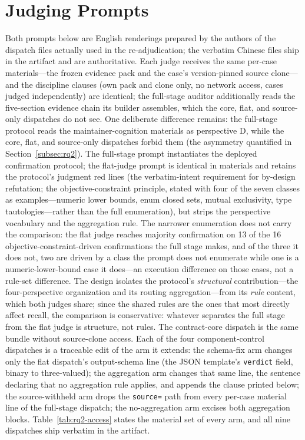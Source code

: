 \documentclass[acmsmall,screen,review,anonymous]{acmart}
\begin{document}



\appendix
\section{Judging Prompts}
\label{app:prompts}

Both prompts below are English renderings prepared by the authors of the dispatch files actually used in the re-adjudication; the verbatim Chinese files ship in the artifact and are authoritative. Each judge receives the same per-case materials---the frozen evidence pack and the case's version-pinned source clone---and the discipline clauses (own pack and clone only, no network access, cases judged independently) are identical; the full-stage auditor additionally reads the five-section evidence chain its builder assembles, which the core, flat, and source-only dispatches do not see. One deliberate difference remains: the full-stage protocol reads the maintainer-cognition materials as perspective D, while the core, flat, and source-only dispatches forbid them (the asymmetry quantified in Section~\ref{subsec:rq2}). The full-stage prompt instantiates the deployed confirmation protocol; the flat-judge prompt is identical in materials and retains the protocol's judgment red lines (the verbatim-intent requirement for by-design refutation; the objective-constraint principle, stated with four of the seven classes as examples---numeric lower bounds, enum closed sets, mutual exclusivity, type tautologies---rather than the full enumeration), but strips the perspective vocabulary and the aggregation rule. The narrower enumeration does not carry the comparison: the flat judge reaches majority confirmation on 13 of the 16 objective-constraint-driven confirmations the full stage makes, and of the three it does not, two are driven by a class the prompt does not enumerate while one is a numeric-lower-bound case it does---an execution difference on those cases, not a rule-set difference. The design isolates the protocol's \emph{structural} contribution---the four-perspective organization and its routing aggregation---from its \emph{rule} content, which both judges share; since the shared rules are the ones that most directly affect recall, the comparison is conservative: whatever separates the full stage from the flat judge is structure, not rules. The contract-core dispatch is the same bundle without source-clone access. Each of the four component-control dispatches is a traceable edit of the arm it extends: the schema-fix arm changes only the flat dispatch's output-schema line (the JSON template's \texttt{verdict} field, binary to three-valued); the aggregation arm changes that same line, the sentence declaring that no aggregation rule applies, and appends the clause printed below; the source-withheld arm drops the \texttt{source=} path from every per-case material line of the full-stage dispatch; the no-aggregation arm excises both aggregation blocks. Table~\ref{tab:rq2-access} states the material set of every arm, and all nine dispatches ship verbatim in the artifact.
\end{document}
